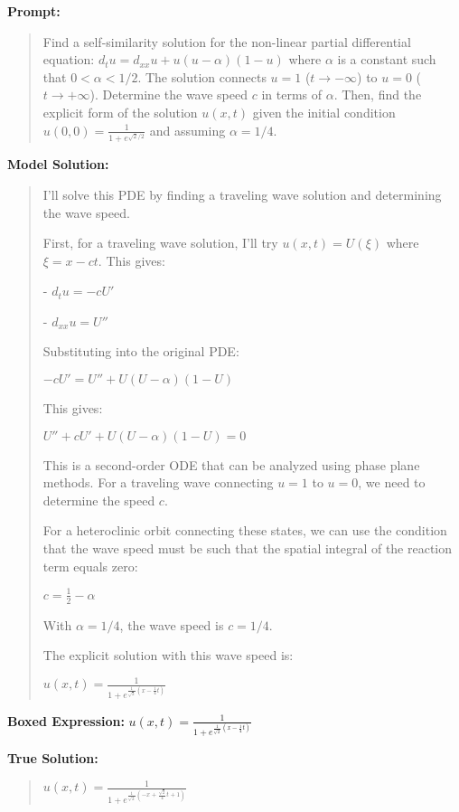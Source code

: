 \documentclass{article}
\begin{document}
\textbf{Prompt:}
\begin{quote}
Find a self-similarity solution for the non-linear partial differential equation: $d_t u = d_{xx}u + u(u - \alpha)(1 - u)$ where $\alpha$ is a constant such that $0 < \alpha < 1/2$. The solution connects $u=1$ ($t \rightarrow -\infty$) to $u=0$ ($t \rightarrow +\infty$). Determine the wave speed $c$ in terms of $\alpha$. Then, find the explicit form of the solution $u(x,t)$ given the initial condition $u(0,0) = \frac{1}{1+e^{\sqrt{2}/2}}$ and assuming $\alpha = 1/4$.
\end{quote}
\textbf{Model Solution:}
\begin{quote}
I'll solve this PDE by finding a traveling wave solution and determining the wave speed.



First, for a traveling wave solution, I'll try $u(x,t) = U(\xi)$ where $\xi = x - ct$. This gives:

- $d_t u = -cU'$

- $d_{xx}u = U''$



Substituting into the original PDE:

$-cU' = U'' + U(U-\alpha)(1-U)$



This gives:

$U'' + cU' + U(U-\alpha)(1-U) = 0$



This is a second-order ODE that can be analyzed using phase plane methods. For a traveling wave connecting $u=1$ to $u=0$, we need to determine the speed $c$.



For a heteroclinic orbit connecting these states, we can use the condition that the wave speed must be such that the spatial integral of the reaction term equals zero:

$c = \frac{1}{2} - \alpha$



With $\alpha = 1/4$, the wave speed is $c = 1/4$.



The explicit solution with this wave speed is:



$\boxed{u(x,t) = \frac{1}{1+e^{\frac{1}{\sqrt{2}}(x-\frac{1}{4}t)}}}$
\end{quote}
\textbf{Boxed Expression:} $u(x,t) = \frac{1}{1+e^{\frac{1}{\sqrt{2}}(x-\frac{1}{4}t)}}$

\textbf{True Solution:}
\begin{quote}
$u(x,t) = \frac{1}{1+e^{\frac{1}{\sqrt{2}}(-x + \frac{\sqrt{2}}{4}t + 1)}}$
\end{quote}
\end{document}
